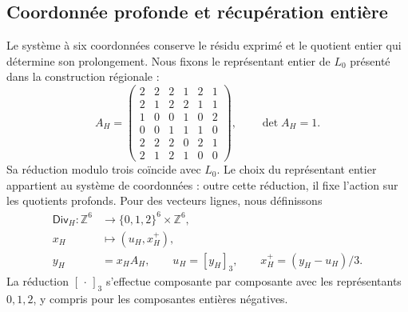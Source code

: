 \subsection{Coordonnée profonde et récupération entière}
\label{corpus9:xii:memoria-profunda}

Le système à six coordonnées conserve le résidu exprimé et le quotient
entier qui détermine son prolongement. Nous fixons le représentant entier de
\(L_0\) présenté dans la construction régionale :
\begin{equation}
 A_H=\begin{pmatrix}
 2&2&2&1&2&1\\
 2&1&2&2&1&1\\
 1&0&0&1&0&2\\
 0&0&1&1&1&0\\
 2&2&2&0&2&1\\
 2&1&2&1&0&0
 \end{pmatrix},\qquad \det A_H=1.
 \label{corpus9:xii:matriz-profunda}
\end{equation}
Sa réduction modulo trois coïncide avec \(L_0\). Le choix du
représentant entier appartient au système de coordonnées : outre cette réduction, il fixe
l’action sur les quotients profonds. Pour des vecteurs lignes, nous définissons
\begin{equation}
 \begin{aligned}
 \mathsf{Div}_H:\mathbb Z^6&\longrightarrow
       \{0,1,2\}^6\times\mathbb Z^6,\\
 x_H&\longmapsto(u_H,x_H^+),\\
 y_H&=x_HA_H,\qquad u_H=[y_H]_3,\qquad
 x_H^+=(y_H-u_H)/3.
 \end{aligned}
 \label{corpus9:xii:division-profunda}
\end{equation}
La réduction \([\,\cdot\,]_3\) s’effectue composante par composante avec les
représentants \(0,1,2\), y compris pour les composantes entières négatives.

